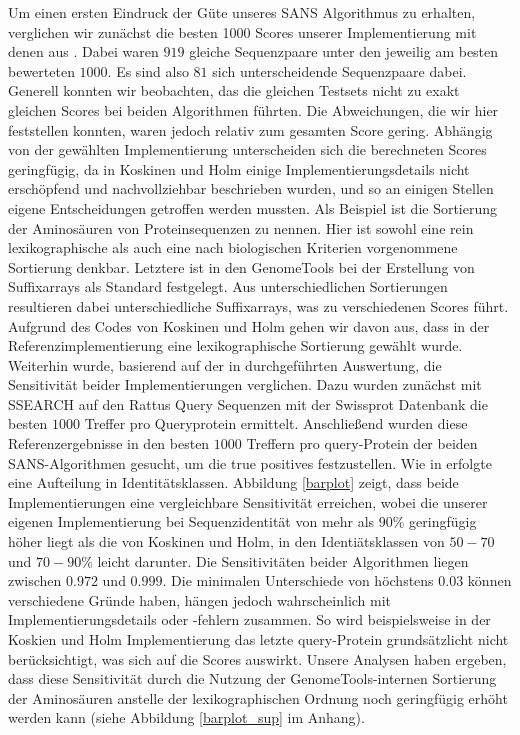 \documentclass{article}
\begin{document}
Um einen ersten Eindruck der Güte unseres SANS Algorithmus zu erhalten, verglichen wir zunächst die besten 1000 Scores unserer Implementierung
mit denen aus \cite{Holm}. Dabei waren $919$ gleiche Sequenzpaare unter den jeweilig am besten bewerteten $1000$. Es sind also $81$ sich unterscheidende 
Sequenzpaare dabei. Generell konnten wir beobachten, das die gleichen Testsets nicht zu exakt gleichen Scores bei beiden Algorithmen führten. Die
Abweichungen, die wir hier feststellen konnten, waren jedoch relativ zum gesamten Score gering.
Abhängig von der gewählten Implementierung unterscheiden sich die berechneten Scores geringfügig,  da in Koskinen und Holm  \cite{Holm} einige Implementierungsdetails nicht erschöpfend und nachvollziehbar beschrieben wurden,
und so an einigen Stellen eigene Entscheidungen getroffen werden mussten. Als Beispiel ist die Sortierung der Aminosäuren von Proteinsequenzen
zu nennen. Hier ist sowohl eine rein lexikographische als auch eine nach biologischen Kriterien vorgenommene Sortierung denkbar. Letztere ist in den GenomeTools \cite{gtools} bei der Erstellung von Suffixarrays als Standard festgelegt. 
Aus unterschiedlichen
Sortierungen resultieren dabei unterschiedliche Suffixarrays, was zu verschiedenen Scores führt. 
Aufgrund des Codes von Koskinen und Holm gehen wir davon aus, dass in der Referenzimplementierung eine lexikographische Sortierung gewählt wurde.
Weiterhin wurde, basierend auf der in \cite{Holm} durchgeführten Auswertung, die Sensitivität beider Implementierungen verglichen. Dazu wurden zunächst mit SSEARCH auf den Rattus Query
Sequenzen mit der Swissprot Datenbank die besten $1000$ Treffer pro Queryprotein ermittelt. 
Anschließend wurden diese Referenzergebnisse in den besten $1000$ Treffern pro query-Protein der beiden SANS-Algorithmen gesucht, um die true positives festzustellen. 
Wie in \cite{Holm} erfolgte eine Aufteilung in Identitätsklassen. Abbildung \ref{barplot} zeigt, dass beide Implementierungen eine vergleichbare Sensitivität erreichen, wobei die
unserer eigenen Implementierung bei Sequenzidentität von mehr als $90\%$ geringfügig höher liegt als die von Koskinen und Holm, in den Identiätsklassen von $50-70$ und $70-90\%$ leicht darunter. 
Die Sensitivitäten beider Algorithmen liegen zwischen $0.972$ und $0.999$.
Die minimalen Unterschiede von höchstens $0.03$ können verschiedene Gründe haben, hängen jedoch wahrscheinlich mit Implementierungsdetails
oder -fehlern zusammen. So wird beispielsweise in der Koskien und Holm Implementierung das letzte query-Protein grundsätzlicht nicht berücksichtigt, was sich auf die Scores auswirkt.
Unsere Analysen haben ergeben, dass diese Sensitivität durch die Nutzung der
GenomeTools-internen Sortierung der Aminosäuren anstelle der lexikographischen Ordnung noch geringfügig erhöht werden kann (siehe Abbildung \ref{barplot_sup} im Anhang).
\end{document}
